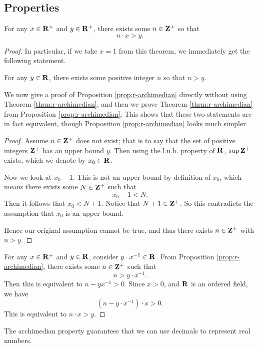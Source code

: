 \subsection{Properties}
\begin{theorem}[$\RR$ is archimedian]\label{thrm:r-archimedian}
For any $x\in\mathbf R^+$ and $y\in\mathbf R^+$, there exists some $n\in\mathbf Z^+$ so that
\[n\cdot x>y.\]
\end{theorem}

\begin{proof}
In particular, if we take $x=1$ from this theorem, we immediately get the following statement.

\begin{proposition}\label{prop:r-archimedian}
For any $y\in\mathbf R$, there exists some positive integer $n$ so that $n>y$.
\end{proposition}

We now give a proof of Proposition \ref{prop:r-archimedian} directly without using Theorem \ref{thrm:r-archimedian}, and then we prove Theorem \ref{thrm:r-archimedian} from Proposition \ref{prop:r-archimedian}. This shows that these two statements are in fact equivalent, though Proposition \ref{prop:r-archimedian} looks much simpler.

\begin{proof}
Assume $n\in\mathbf Z^+$ does not exist; that is to say that the set of positive integers $\mathbf Z^+$ has an upper bound $y$. Then using the l.u.b. property of $\RR$, $\sup\mathbf Z^+$ exists, which we denote by $x_0\in\mathbf R$.

Now we look at $x_0-1$. This is not an upper bound by definition of $x_0$, which means there exists some $N\in\mathbf Z^+$ such that
\[x_0-1<N.\]
Then it follows that $x_0<N+1$. Notice that $N+1\in\mathbf Z^+$. So this contradicts the assumption that $x_0$ is an upper bound.

Hence our original assumption cannot be true, and thus there exists $n\in\mathbf Z^+$ with $n>y$.
\end{proof}

For any $x\in\mathbf R^+$ and $y\in\mathbf R$, consider $y\cdot x^{-1}\in\mathbf R$. From Proposition \ref{prop:r-archimedian}, there exists some $n\in\mathbf Z^+$ such that
\[n>y\cdot x^{-1}.\]
Then this is equivalent to $n-yx^{-1}>0$. Since $x>0$, and $\RR$ is an ordered field, we have
\[(n-y\cdot x^{-1})\cdot x>0.\]
This is equivalent to $n\cdot x>y$.
\end{proof}

\begin{remark}
The archimedian property guarantees that we can use decimals to represent real numbers. %
\end{remark}

